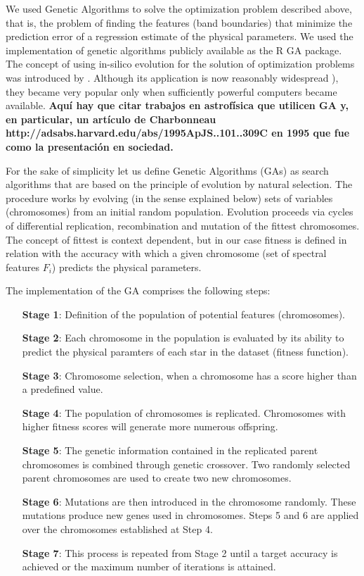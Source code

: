 We used Genetic Algorithms to solve the optimization problem described
above, that is, the problem of finding the features (band boundaries)
that minimize the prediction error of a regression estimate of the
physical parameters. We used the implementation of genetic algorithms
publicly available as the R \citep{R2013} GA  package. The concept of
using in-silico evolution for the solution of optimization problems
was introduced by \cite{holland1975adaptation}. Although its
application is now reasonably widespread \citep[see
e.g. ]{goldberg1989genetic}), they became very popular only when
sufficiently powerful computers became available. {\bf Aquí hay que
citar trabajos en astrofísica que utilicen GA y, en particular, un
artículo de Charbonneau
http://adsabs.harvard.edu/abs/1995ApJS..101..309C en 1995 que fue como
la presentación en sociedad.}

For the sake of simplicity let us define Genetic Algorithms (GAs) as
search algorithms that are based on the principle of evolution by
natural selection. The procedure works by evolving (in the sense
explained below) sets of variables (chromosomes) from an initial
random population. Evolution proceeds via cycles of differential
replication, recombination and mutation of the fittest
chromosomes. The concept of fittest is context dependent, but in our
case fitness is defined in relation with the accuracy with which a
given chromosome (set of spectral features ${F_i}$) predicts the
physical parameters.

The implementation of the GA comprises the following steps:

\begin{itemize}
\item [\textbf{Stage 1}:]{Definition of the population of potential features (chromosomes).}
\item [\textbf{Stage 2}:]{Each chromosome in the population is evaluated by its ability to
predict the physical paramters of each star in the dataset (fitness
function).}
\item [\textbf{Stage 3}:]{Chromosome selection, when a chromosome has 
 a score higher than a predefined value.}
\item [\textbf{Stage 4}:]{The population of chromosomes is replicated. 
 Chromosomes with higher fitness scores will generate more numerous
 offspring.}
\item [\textbf{Stage 5}:]{The genetic information contained in the replicated parent
chromosomes is combined through genetic crossover. Two randomly
selected parent chromosomes are used to create two new chromosomes.}
\item [\textbf{Stage 6}:]{Mutations are then introduced in the chromosome randomly. 
 These mutations produce new genes used in chromosomes.  Steps 5 and 6
 are applied over the chromosomes established at Step 4.}
\item [\textbf{Stage 7}:]{This process is repeated from Stage 2 until 
  a target accuracy is achieved or the maximum number of iterations is
  attained.}
\end{itemize}

